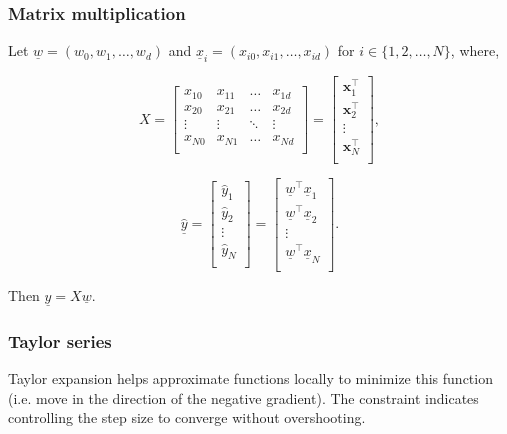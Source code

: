 \subsubsection{Matrix multiplication}
\begin{definition}
    Let $\underline{w} = (w_0, w_1, \dots, w_d)$ and $\underline{x}_i = (x_{i0}, x_{i1}, \dots, x_{id})$ for $i \in \{1, 2, \dots, N\}$, where,

    \[
    X = 
    \begin{bmatrix}
    x_{10} & x_{11} & \dots & x_{1d} \\
    x_{20} & x_{21} & \dots & x_{2d} \\
    \vdots & \vdots & \ddots & \vdots \\
    x_{N0} & x_{N1} & \dots & x_{Nd} \\
    \end{bmatrix}
    = 
    \begin{bmatrix}
    \mathbf{x}_1^\top \\
    \mathbf{x}_2^\top \\
    \vdots \\
    \mathbf{x}_N^\top \\
    \end{bmatrix},
    \]

    \[
    \hat{\underline{y}} = 
    \begin{bmatrix}
    \hat{y}_1 \\
    \hat{y}_2 \\
    \vdots \\
    \hat{y}_N \\
    \end{bmatrix}
    = 
    \begin{bmatrix}
    \underline{w}^\top \underline{x}_1 \\
    \underline{w}^\top \underline{x}_2 \\
    \vdots \\
    \underline{w}^\top \underline{x}_N \\
    \end{bmatrix}.
    \]

    Then $\hat{\underline{y}} = X\underline{w}$.
\end{definition}

\subsubsection{Taylor series}
\begin{intuition}
    Taylor expansion helps approximate functions locally to minimize this function (i.e. move in the direction of the negative gradient). The constraint indicates controlling the step size to converge without overshooting.
\end{intuition}

